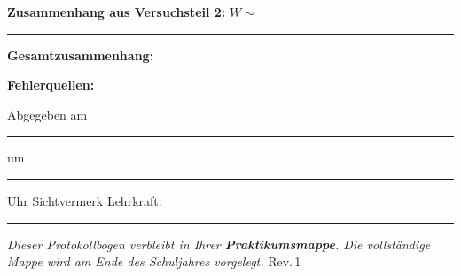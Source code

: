 \documentclass[11pt,a4paper]{scrartcl}
\begin{document}
	\textbf{Zusammenhang aus Versuchsteil 2:} $W \sim$ \rule{3cm}{0.4pt}
	
	\vspace{0.5cm}
	
	\textbf{Gesamtzusammenhang:}
	
	\vspace{1.5cm}
	
	\textbf{Fehlerquellen:}
	
	\vspace{4cm}
	

	\vspace{0.4cm}
	\begin{tcolorbox}[colback=yellow!8, colframe=black, boxrule=0.6pt, title={\faIcon{check-circle}\enspace Abgabevermerk -- wird vor Ort ausgefüllt}, fonttitle=\bfseries]
		Abgegeben am \rule{2.8cm}{0.4pt} \enspace um \rule{2cm}{0.4pt} Uhr \hfill Sichtvermerk Lehrkraft: \rule{3.5cm}{0.4pt}

		\vspace{0.15cm}
		{\small\textit{Dieser Protokollbogen verbleibt in Ihrer \textbf{Praktikumsmappe}. Die vollständige Mappe wird am Ende des Schuljahres vorgelegt.} \hfill \scriptsize Rev.\,1}
	\end{tcolorbox}
\end{document}
